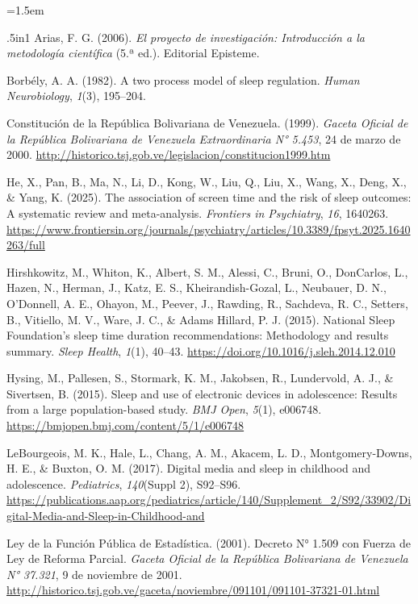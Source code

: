 \documentclass[12pt, letterpaper]{article}
\begin{document}
{\emergencystretch=1.5em
\begin{hangparas}{.5in}{1}
Arias, F. G. (2006). \textit{El proyecto de investigación: Introducción a la metodología científica} (5.ª ed.). Editorial Episteme.

Borbély, A. A. (1982). A two process model of sleep regulation. \textit{Human Neurobiology}, \textit{1}(3), 195--204.

Constitución de la República Bolivariana de Venezuela. (1999). \textit{Gaceta Oficial de la República Bolivariana de Venezuela Extraordinaria N° 5.453}, 24 de marzo de 2000. \url{http://historico.tsj.gob.ve/legislacion/constitucion1999.htm}

He, X., Pan, B., Ma, N., Li, D., Kong, W., Liu, Q., Liu, X., Wang, X., Deng, X., \& Yang, K. (2025). The association of screen time and the risk of sleep outcomes: A systematic review and meta-analysis. \textit{Frontiers in Psychiatry}, \textit{16}, 1640263. \url{https://www.frontiersin.org/journals/psychiatry/articles/10.3389/fpsyt.2025.1640263/full}

Hirshkowitz, M., Whiton, K., Albert, S. M., Alessi, C., Bruni, O., DonCarlos, L., Hazen, N., Herman, J., Katz, E. S., Kheirandish-Gozal, L., Neubauer, D. N., O'Donnell, A. E., Ohayon, M., Peever, J., Rawding, R., Sachdeva, R. C., Setters, B., Vitiello, M. V., Ware, J. C., \& Adams Hillard, P. J. (2015). National Sleep Foundation's sleep time duration recommendations: Methodology and results summary. \textit{Sleep Health}, \textit{1}(1), 40--43. \url{https://doi.org/10.1016/j.sleh.2014.12.010}

Hysing, M., Pallesen, S., Stormark, K. M., Jakobsen, R., Lundervold, A. J., \& Sivertsen, B. (2015). Sleep and use of electronic devices in adolescence: Results from a large population-based study. \textit{BMJ Open}, \textit{5}(1), e006748. \url{https://bmjopen.bmj.com/content/5/1/e006748}

LeBourgeois, M. K., Hale, L., Chang, A. M., Akacem, L. D., Montgomery-Downs, H. E., \& Buxton, O. M. (2017). Digital media and sleep in childhood and adolescence. \textit{Pediatrics}, \textit{140}(Suppl 2), S92--S96. \url{https://publications.aap.org/pediatrics/article/140/Supplement_2/S92/33902/Digital-Media-and-Sleep-in-Childhood-and}

Ley de la Función Pública de Estadística. (2001). Decreto N° 1.509 con Fuerza de Ley de Reforma Parcial. \textit{Gaceta Oficial de la República Bolivariana de Venezuela N° 37.321}, 9 de noviembre de 2001. \url{http://historico.tsj.gob.ve/gaceta/noviembre/091101/091101-37321-01.html}


\end{hangparas}}
\end{document}
